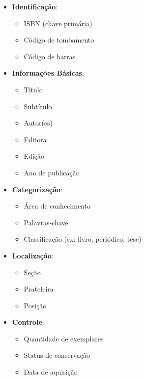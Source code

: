 \documentclass[12pt,a4paper]{article}
\begin{document}
\begin{tcolorbox}[title=Livro]
\begin{itemize}[leftmargin=*]
    \item \textbf{Identificação}:
    \begin{itemize}
        \item ISBN (chave primária)
        \item Código de tombamento
        \item Código de barras
    \end{itemize}
    \item \textbf{Informações Básicas}:
    \begin{itemize}
        \item Título
        \item Subtítulo
        \item Autor(es)
        \item Editora
        \item Edição
        \item Ano de publicação
    \end{itemize}
    \item \textbf{Categorização}:
    \begin{itemize}
        \item Área de conhecimento
        \item Palavras-chave
        \item Classificação (ex: livro, periódico, tese)
    \end{itemize}
    \item \textbf{Localização}:
    \begin{itemize}
        \item Seção
        \item Prateleira
        \item Posição
    \end{itemize}
    \item \textbf{Controle}:
    \begin{itemize}
        \item Quantidade de exemplares
        \item Status de conservação
        \item Data de aquisição
    \end{itemize}
\end{itemize}
\end{tcolorbox}
\end{document}
